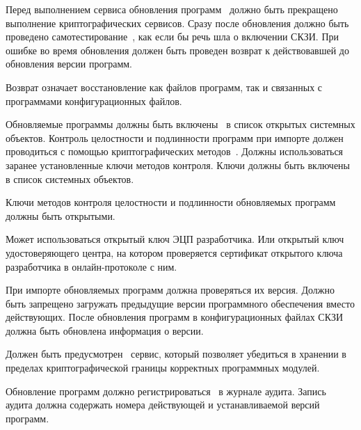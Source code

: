 \label{R.SU.Logic} %
Перед выполнением сервиса обновления программ~ 
должно быть прекращено выполнение криптографических сервисов. 
%
Сразу после обновления должно быть проведено 
самотестирование~, 
как если бы речь шла о включении СКЗИ.
%
При ошибке во время обновления должен быть проведен
возврат к действовавшей до обновления версии программ. 

\begin{note}
Возврат означает восстановление как файлов программ, так и связанных с 
программами конфигурационных файлов. 
\end{note}

\label{R.SU.Import} %
Обновляемые программы должны быть включены~ в список
открытых системных объектов. Контроль целостности и подлинности программ при
импорте должен проводиться с помощью криптографических
методов~. Должны использоваться заранее установленные ключи
методов контроля. Ключи должны быть включены~ в список
системных объектов.

\label{R.SU.Sig} %
Ключи методов контроля целостности и подлинности обновляемых программ должны 
быть открытыми. 

\begin{note}
Может использоваться открытый ключ ЭЦП разработчика. Или открытый ключ
удостоверяющего центра, на котором проверяется сертификат открытого ключа
разработчика в онлайн-протоколе с ним.
\end{note}

\label{R.SU.Version} %
При импорте обновляемых программ должна проверяться их версия.
Должно быть запрещено загружать предыдущие версии программного обеспечения 
вместо действующих. После обновления программ в конфигурационных файлах СКЗИ
должна быть обновлена информация о версии.

\label{R.SU.PoS} %
Должен быть предусмотрен~ сервис, который позволяет убедиться
в хранении в пределах криптографической границы корректных программных модулей.

\label{R.SU.AU} %
Обновление программ должно регистрироваться~ в журнале
аудита.
%
Запись аудита должна содержать номера действующей и устанавливаемой версий
программ.

